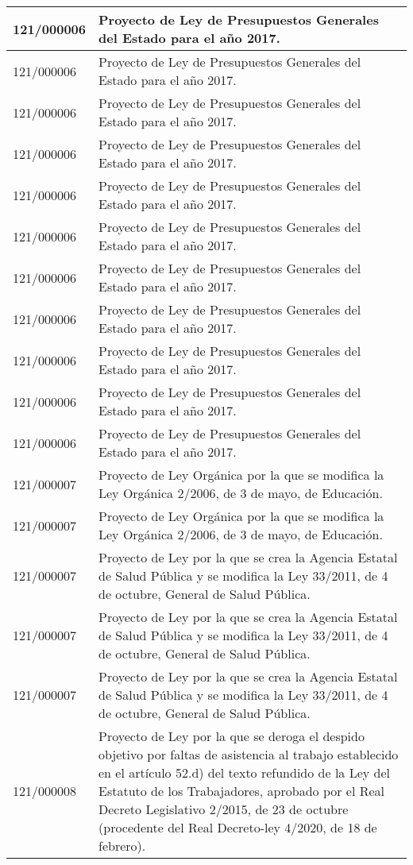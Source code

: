 {\begin{table}[H]
\begin{center}
\begin{tabularx}{\linewidth}{| l | X |}
\hline
121/000006 & Proyecto de Ley de Presupuestos Generales del Estado para el año 2017. \\
\hline
121/000006 & Proyecto de Ley de Presupuestos Generales del Estado para el año 2017. \\
\hline
121/000006 & Proyecto de Ley de Presupuestos Generales del Estado para el año 2017. \\
\hline
121/000006 & Proyecto de Ley de Presupuestos Generales del Estado para el año 2017. \\
\hline
121/000006 & Proyecto de Ley de Presupuestos Generales del Estado para el año 2017. \\
\hline
121/000006 & Proyecto de Ley de Presupuestos Generales del Estado para el año 2017. \\
\hline
121/000006 & Proyecto de Ley de Presupuestos Generales del Estado para el año 2017. \\
\hline
121/000006 & Proyecto de Ley de Presupuestos Generales del Estado para el año 2017. \\
\hline
121/000006 & Proyecto de Ley de Presupuestos Generales del Estado para el año 2017. \\
\hline
121/000006 & Proyecto de Ley de Presupuestos Generales del Estado para el año 2017. \\
\hline
121/000006 & Proyecto de Ley de Presupuestos Generales del Estado para el año 2017. \\
\hline
121/000007 & Proyecto de Ley Orgánica por la que se modifica la Ley Orgánica 2/2006, de 3 de mayo, de Educación. \\
\hline
121/000007 & Proyecto de Ley Orgánica por la que se modifica la Ley Orgánica 2/2006, de 3 de mayo, de Educación. \\
\hline
121/000007 & Proyecto de Ley por la que se crea la Agencia Estatal de Salud Pública y se modifica la Ley 33/2011, de 4 de octubre, General de Salud Pública. \\
\hline
121/000007 & Proyecto de Ley por la que se crea la Agencia Estatal de Salud Pública y se modifica la Ley 33/2011, de 4 de octubre, General de Salud Pública. \\
\hline
121/000007 & Proyecto de Ley por la que se crea la Agencia Estatal de Salud Pública y se modifica la Ley 33/2011, de 4 de octubre, General de Salud Pública. \\
\hline
121/000008 & Proyecto de Ley por la que se deroga el despido objetivo por faltas de asistencia al trabajo establecido en el artículo 52.d) del texto refundido de la Ley del Estatuto de los Trabajadores, aprobado por el Real Decreto Legislativo 2/2015, de 23 de octubre (procedente del Real Decreto-ley 4/2020, de 18 de febrero). \\

\end{tabularx}
\end{center}
\end{table}}

